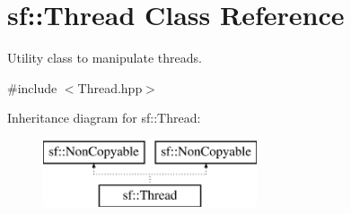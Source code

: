 \hypertarget{classsf_1_1_thread}{\section{sf\-:\-:Thread Class Reference}
\label{classsf_1_1_thread}
}


Utility class to manipulate threads.  




{\ttfamily \#include $<$Thread.\-hpp$>$}

Inheritance diagram for sf\-:\-:Thread\-:\begin{figure}[H]
\begin{center}
\leavevmode
\includegraphics[height=2.000000cm]{classsf_1_1_thread}
\end{center}
\end{figure}
